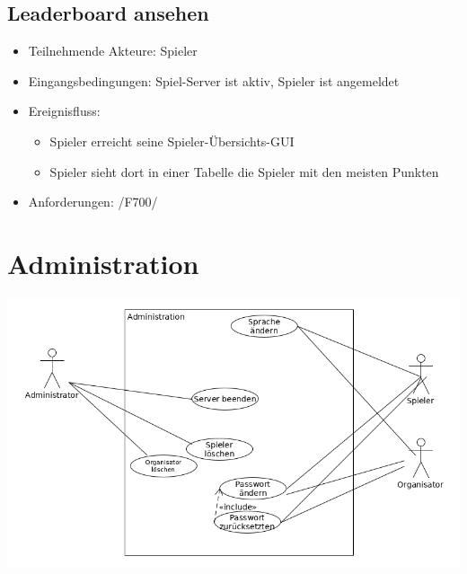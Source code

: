 \documentclass[a4paper]{scrreprt}
\begin{document}
    \subsection{Leaderboard ansehen}
    \begin{itemize}
        \item Teilnehmende Akteure: \Gls{Spieler}
        \item Eingangsbedingungen: \Gls{Spiel-Server} ist aktiv, \Gls{Spieler} ist angemeldet
        \item Ereignisfluss:
        \begin{itemize}
            \item \Gls{Spieler} erreicht seine Spieler-Übersichts-GUI
            \item \Gls{Spieler} sieht dort in einer Tabelle die \Gls{Spieler} mit den meisten Punkten
        \end{itemize}
        \item Anforderungen: /F700/
    \end{itemize}

    \newpage
    \section{Administration}
    \includegraphics[width=\textwidth]{uml/export/Administration.png}
\end{document}
